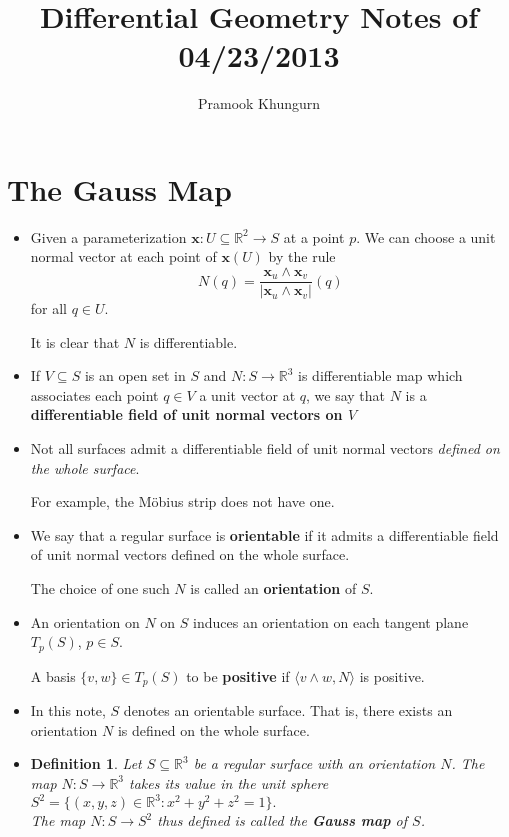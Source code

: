 \documentclass[10pt]{article}
\title{Differential Geometry Notes of 04/23/2013}
\author{Pramook Khungurn}
\newtheorem{definition}[lemma]{Definition}
\newcommand{\ve}[1]{\mathbf{#1}}
\newcommand{\ra}{\rightarrow}
\newcommand{\Real}{\mathbb{R}}
\newcommand{\sseq}{\subseteq}
\begin{document}
  \maketitle

  \section{The Gauss Map}
  
  \begin{itemize}
    \item Given a parameterization $\ve{x} : U \sseq \Real^2 \ra S$ at a point $p$. We can choose a unit normal vector at each point of $\ve{x}(U)$ by the rule $$N(q) = \frac{\ve{x}_u \wedge \ve{x}_v}{|\ve{x}_u \wedge \ve{x}_v|}(q)$$
    for all $q \in U$.

    It is clear that $N$ is differentiable.

    \item If $V \sseq S$ is an open set in $S$ and $N:S \ra \Real^3$ is differentiable map which associates each point $q \in V$ a unit vector at $q$, we say that $N$ is a {\bf differentiable field of unit normal vectors on $V$}

    \item Not all surfaces admit a differentiable field of unit normal vectors {\it defined on the whole surface}.

    For example, the M\"{o}bius strip does not have one.

    \item We say that a regular surface is {\bf orientable} if it admits a differentiable field of unit normal vectors defined on the whole surface.

    The choice of one such $N$ is called an {\bf orientation} of $S$.

    \item An orientation on $N$ on $S$ induces an orientation on each tangent plane $T_p(S)$, $p \in S$.

    A basis $\{v, w\} \in T_p(S)$ to be {\bf positive} if $\langle v \wedge w, N \rangle$ is positive.

    \item In this note, $S$ denotes an orientable surface. That is, there exists an orientation $N$ is defined on the whole surface.

    \item \begin{definition}
      Let $S \sseq \Real^3$ be a regular surface with an orientation $N$. The map $N: S \ra \Real^3$ takes its value in the unit sphere $S^2 = \{(x,y,z) \in \Real^3: x^2 + y^2 + z^2 = 1 \}.$\\
      The map $N: S \ra S^2$ thus defined is called the {\bf Gauss map} of $S$.
    \end{definition}    


\end{itemize}
\end{document}
